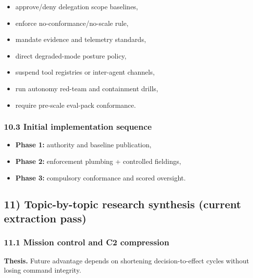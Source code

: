 \documentclass[11pt]{article}
\begin{document}
\begin{itemize}
\tightlist
\item
  approve/deny delegation scope baselines,
\item
  enforce no-conformance/no-scale rule,
\item
  mandate evidence and telemetry standards,
\item
  direct degraded-mode posture policy,
\item
  suspend tool registries or inter-agent channels,
\item
  run autonomy red-team and containment drills,
\item
  require pre-scale eval-pack conformance.
\end{itemize}

\hypertarget{initial-implementation-sequence}{%
\subsubsection{10.3 Initial implementation
sequence}\label{initial-implementation-sequence}}

\begin{itemize}
\tightlist
\item
  \textbf{Phase 1:} authority and baseline publication,
\item
  \textbf{Phase 2:} enforcement plumbing + controlled fieldings,
\item
  \textbf{Phase 3:} compulsory conformance and scored oversight.
\end{itemize}

\hypertarget{topic-by-topic-research-synthesis-current-extraction-pass}{%
\subsection{11) Topic-by-topic research synthesis (current extraction
pass)}\label{topic-by-topic-research-synthesis-current-extraction-pass}}

\hypertarget{mission-control-and-c2-compression}{%
\subsubsection{11.1 Mission control and C2
compression}\label{mission-control-and-c2-compression}}

\textbf{Thesis.} Future advantage depends on shortening
decision-to-effect cycles without losing command integrity.
\end{document}
